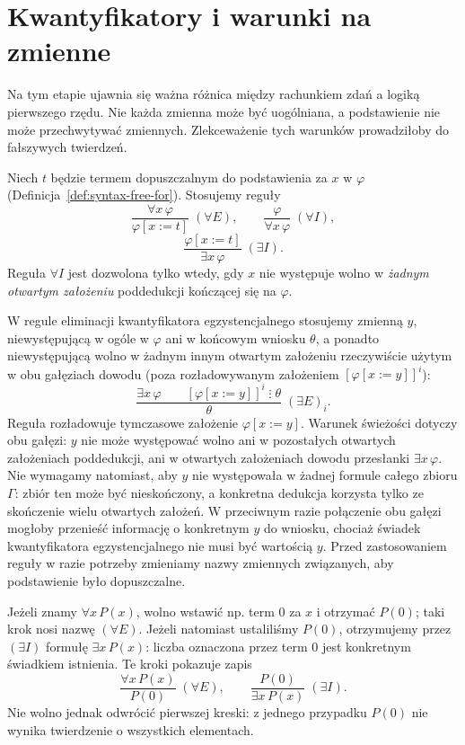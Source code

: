 \section{Kwantyfikatory i warunki na zmienne}
Na tym etapie ujawnia się ważna różnica między rachunkiem zdań
a logiką pierwszego rzędu. Nie każda zmienna może być
uogólniana, a podstawienie nie może przechwytywać zmiennych.
Zlekceważenie tych warunków prowadziłoby do fałszywych twierdzeń.

\begin{definicja}\label{def:nd-rules-quant}
Niech $t$ będzie termem dopuszczalnym do podstawienia
za $x$ w $\varphi$ (Definicja~\ref{def:syntax-free-for}).
Stosujemy reguły
\[
\frac{\forall x\,\varphi}{\varphi[x:=t]}\;(\forall E),
\qquad
\frac{\varphi}{\forall x\,\varphi}\;(\forall I),
\]
\[
\frac{\varphi[x:=t]}{\exists x\,\varphi}\;(\exists I).
\]
Reguła $\forall I$ jest dozwolona tylko wtedy, gdy $x$
nie występuje wolno w \emph{żadnym otwartym założeniu}
poddedukcji kończącej się na $\varphi$.

W regule eliminacji kwantyfikatora egzystencjalnego
stosujemy zmienną $y$, niewystępującą w ogóle
w $\varphi$ ani w końcowym wniosku $\theta$,
a ponadto niewystępującą wolno w żadnym innym
otwartym założeniu rzeczywiście użytym w obu
gałęziach dowodu (poza rozładowywanym założeniem
$[\varphi[x:=y]]^i$):
\[
\frac{\exists x\,\varphi\qquad
[\varphi[x:=y]]^i\;\vdots\;\theta}
{\theta}\;(\exists E)_i.
\]
Reguła rozładowuje tymczasowe założenie
$\varphi[x:=y]$. Warunek świeżości dotyczy obu gałęzi:
$y$ nie może występować wolno ani w pozostałych otwartych
założeniach poddedukcji, ani w otwartych założeniach dowodu
przesłanki $\exists x\,\varphi$.
Nie wymagamy natomiast, aby $y$ nie występowała w żadnej
formule całego zbioru $\Gamma$: zbiór ten może być nieskończony,
a konkretna dedukcja korzysta tylko ze skończenie wielu
otwartych założeń. W przeciwnym razie połączenie obu gałęzi
mogłoby przenieść informację o konkretnym $y$ do wniosku,
chociaż świadek kwantyfikatora egzystencjalnego nie musi
być wartością $y$. Przed zastosowaniem reguły w razie
potrzeby zmieniamy nazwy zmiennych związanych,
aby podstawienie było dopuszczalne.
\end{definicja}

\begin{przyklad}
Jeżeli znamy $\forall x\,P(x)$, wolno wstawić np. term $0$ za $x$
i otrzymać $P(0)$; taki krok nosi nazwę $(\forall E)$.
Jeżeli natomiast ustaliliśmy $P(0)$, otrzymujemy przez $(\exists I)$
formułę $\exists x\,P(x)$: liczba oznaczona przez term $0$ jest
konkretnym świadkiem istnienia. Te kroki pokazuje zapis
\[
\frac{\forall x\,P(x)}{P(0)}\;(\forall E),
\qquad
\frac{P(0)}{\exists x\,P(x)}\;(\exists I).
\]
Nie wolno jednak odwrócić pierwszej kreski: z jednego przypadku
$P(0)$ nie wynika twierdzenie o wszystkich elementach.
\end{przyklad}

